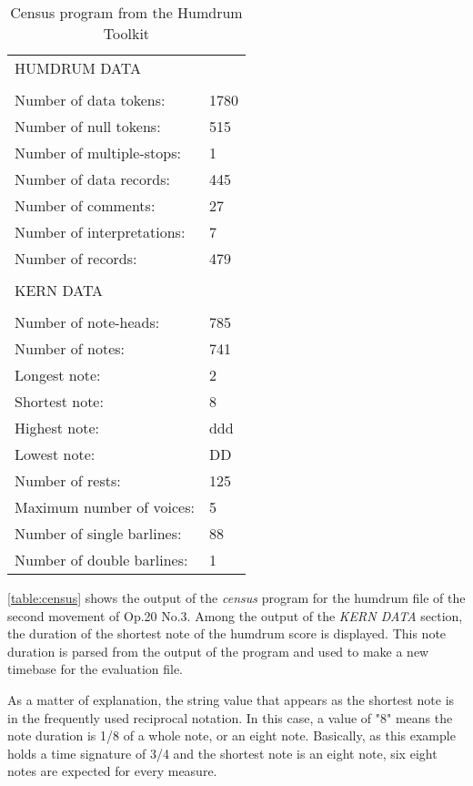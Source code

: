 		\begin{table}[]
		\centering
		\begin{tabular}{ll}
		HUMDRUM DATA &  \\
		 &  \\
		Number of data tokens: & 1780 \\
		Number of null tokens: & 515 \\
		Number of multiple-stops: & 1 \\
		Number of data records: & 445 \\
		Number of comments: & 27 \\
		Number of interpretations: & 7 \\
		Number of records: & 479 \\
		 &  \\
		KERN DATA &  \\
		 &  \\
		Number of note-heads: & 785 \\
		Number of notes: & 741 \\
		Longest note: & 2 \\
		Shortest note: & 8 \\
		Highest note: & ddd \\
		Lowest note: & DD \\
		Number of rests: & 125 \\
		Maximum number of voices: & 5 \\
		Number of single barlines: & 88 \\
		Number of double barlines: & 1
		\end{tabular}
		\caption{Census program from the Humdrum Toolkit}
		\label{table:census}
		\end{table}

		\autoref{table:census} shows the output of the \emph{census} program for the humdrum file of the second movement of Op.20 No.3. Among the output of the \emph{KERN DATA} section, the duration of the shortest note of the humdrum score is displayed. This note duration is parsed from the output of the program and used to make a new timebase for the evaluation file.

		As a matter of explanation, the string value that appears as the shortest note is in the frequently used reciprocal notation. In this case, a value of "8" means the note duration is 1/8 of a whole note, or an eight note. Basically, as this example holds a time signature of 3/4 and the shortest note is an eight note, six eight notes are expected for every measure.

